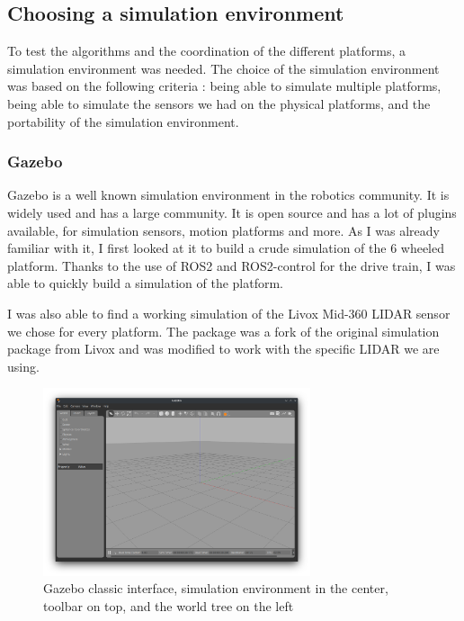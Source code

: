 \documentclass[12pt]{article}
\begin{document}
    \subsection{Choosing a simulation environment}

        To test the algorithms and the coordination of the different platforms, a simulation environment was needed. The choice of the simulation environment was based on the following criteria : being able to simulate multiple platforms, being able to simulate the sensors we had on the physical platforms, and the portability of the simulation environment.


        \subsubsection{Gazebo}
            Gazebo is a well known simulation environment in the robotics community. It is widely used and has a large community. It is open source and has a lot of plugins available, for simulation sensors, motion platforms and more. As I was already familiar with it, I first looked at it to build a crude simulation of the 6 wheeled platform. Thanks to the use of ROS2 and ROS2-control for the drive train, I was able to quickly build a simulation of the platform. 

            I was also able to find a working simulation of the Livox Mid-360 LIDAR sensor we chose for every platform. The package \cite{livox_lidar_simulation_fork} was a fork of the original simulation package from Livox \cite{livox_laser_simulation} and was modified to work with the specific LIDAR we are using.
            
            \begin{figure}[H]
                \centering
                \includegraphics[width=0.7\textwidth]{Images/gazebo_interface.png}
                \caption{Gazebo classic interface, simulation environment in the center, toolbar on top, and the world tree on the left}
                \label{fig:gazebo_simulation}
            \end{figure}
\end{document}
